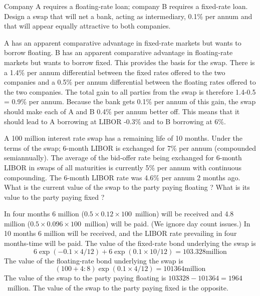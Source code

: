 \documentclass[12pt,a4paper]{exam}
\begin{document}
\begin{questions}
Company A requires a floating-rate loan; company B requires a fixed-rate loan. Design a swap that will net a bank, acting as intermediary, 0.1\% per annum and that will appear equally attractive to both companies.
\begin{solution}
A has an apparent comparative advantage in fixed-rate markets but wants to borrow floating. B has an apparent comparative advantage in floating-rate markets but wants to borrow fixed. This provides the basis for the swap. There is a 1.4\% per annum differential between the fixed rates offered to the two companies and a 0.5\% per annum
differential between the floating rates offered to the two companies. The total gain to all parties from the swap is therefore 1.4-0.5 = 0.9\% per annum. Because the bank gets 0.1\% per annum of this gain, the swap should make each of A and B 0.4\% per
annum better off. This means that it should lead to A borrowing at LIBOR -0.3\% and to B borrowing at 6\%. 
\end{solution}

\question A 100 million interest rate swap has a remaining life of 10 months. Under the terms of the swap; 6-month LIBOR is exchanged for 7\% per annum (compounded semiannually). The average of the bid-offer rate being exchanged for 6-month LIBOR in swaps of all maturities is currently 5\% per annum with continuous compounding. The 6-month LIBOR rate was 4.6\% per annum 2 months ago. What is the current value of the swap to the party paying floating ? What is its value to the party paying fixed ?

\begin{solution}
In four months 6 million ($0.5\times 0.12\times 100$~million) will be received and 4.8 million ($0.5\times 0.096\times 100$~million) will be paid. (We ignore day count issues.) In 10 months 6 million will be received, and the LIBOR rate prevailing in four months-time will be paid. The value of the fixed-rate bond underlying the swap is
\begin{equation*}
6 \exp(-0.1 \times 4/12) + 6 \exp(0.1\times  10/12) = 103.328 \text{million}
\end{equation*}
The value of the floating-rate bond underlying the swap is 
\begin{equation*}
(100 + 4:8) \exp(0.1\times  4/12) = 101364 \text{million}
\end{equation*}
The value of the swap to the party paying floating is $103328-  101364 = 1964$~million. 
The value of the swap to the party paying fixed is the opposite. 


\end{solution}
\end{questions}
\end{document}
